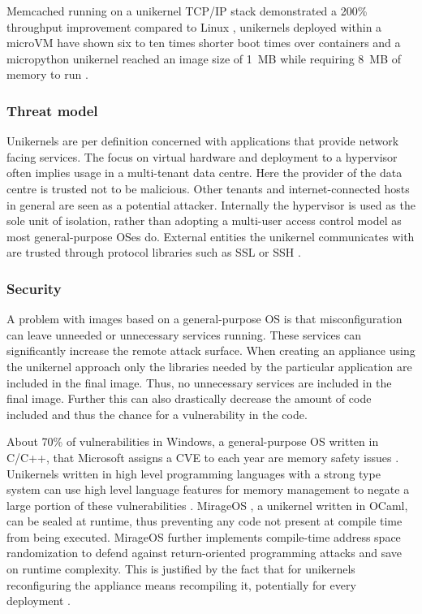 \documentclass[10pt,twocolumn,a4paper]{article}
\begin{document}
      Memcached running on a unikernel TCP/IP stack
      demonstrated a 200\% throughput improvement compared to Linux \cite{schatzberg16},
      unikernels deployed within a microVM have shown six to ten times shorter
      boot times over containers \cite{koller17} and a micropython unikernel reached an image
      size of 1~MB while requiring 8~MB of memory to run \cite{manco17}.

    \subsubsection{Threat model}\label{sec:thread-model}
      Unikernels are per definition concerned with applications that provide network
      facing services. 
      The focus on virtual hardware and deployment to a hypervisor
      often implies usage in a multi-tenant data centre.
      Here the provider of the data centre is trusted not to be malicious.
      Other tenants and internet-connected hosts in general are seen as 
      a potential attacker.
      Internally the hypervisor is used as the sole unit of isolation, 
      rather than adopting a multi-user access control model as most general-purpose OSes do.
      External entities the unikernel communicates with are trusted through
      protocol libraries such as SSL or SSH \cite{madhavapeddy13}.

    \subsubsection{Security}
      A problem with images based on a general-purpose OS is that misconfiguration can
      leave unneeded or unnecessary services running. 
      These services can significantly increase the remote attack surface.
      When creating an appliance using the unikernel approach only the libraries
      needed by the particular application are included in the final image.
      Thus, no unnecessary services are included in the final image.
      Further this can also drastically decrease the amount of code included and thus the chance
      for a vulnerability in the code.
      
      About 70\% of vulnerabilities in Windows, a general-purpose OS written in C/C++,
      that Microsoft assigns a CVE to each year are memory safety issues \cite{msrc-19-07}.
      Unikernels written in high level programming languages with a strong type system 
      can use high level language features for memory management to negate a large
      portion of these vulnerabilities \cite{madhavapeddy13, lankes19}.
      MirageOS \cite{madhavapeddy13}, a unikernel written in OCaml, can be sealed \cite{hunt07} at runtime,
      thus preventing any code not present at compile time from being executed.
      MirageOS further implements compile-time address space randomization to defend against
      return-oriented programming attacks and save on runtime complexity.
      This is justified by the fact that for unikernels reconfiguring the appliance 
      means recompiling it, potentially for every deployment \cite{madhavapeddy13}.
\end{document}
